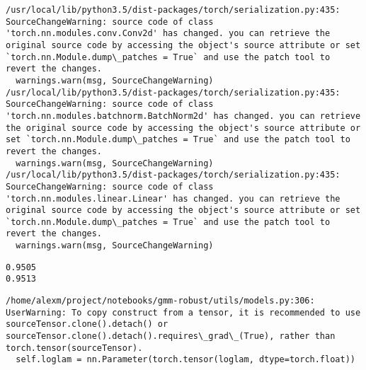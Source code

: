 \documentclass[11pt]{article}
\begin{document}
    \begin{Verbatim}[commandchars=\\\{\}]
/usr/local/lib/python3.5/dist-packages/torch/serialization.py:435: SourceChangeWarning: source code of class 'torch.nn.modules.conv.Conv2d' has changed. you can retrieve the original source code by accessing the object's source attribute or set `torch.nn.Module.dump\_patches = True` and use the patch tool to revert the changes.
  warnings.warn(msg, SourceChangeWarning)
/usr/local/lib/python3.5/dist-packages/torch/serialization.py:435: SourceChangeWarning: source code of class 'torch.nn.modules.batchnorm.BatchNorm2d' has changed. you can retrieve the original source code by accessing the object's source attribute or set `torch.nn.Module.dump\_patches = True` and use the patch tool to revert the changes.
  warnings.warn(msg, SourceChangeWarning)
/usr/local/lib/python3.5/dist-packages/torch/serialization.py:435: SourceChangeWarning: source code of class 'torch.nn.modules.linear.Linear' has changed. you can retrieve the original source code by accessing the object's source attribute or set `torch.nn.Module.dump\_patches = True` and use the patch tool to revert the changes.
  warnings.warn(msg, SourceChangeWarning)

    \end{Verbatim}

    \begin{Verbatim}[commandchars=\\\{\}]
0.9505
0.9513

    \end{Verbatim}

    \begin{Verbatim}[commandchars=\\\{\}]
/home/alexm/project/notebooks/gmm-robust/utils/models.py:306: UserWarning: To copy construct from a tensor, it is recommended to use sourceTensor.clone().detach() or sourceTensor.clone().detach().requires\_grad\_(True), rather than torch.tensor(sourceTensor).
  self.loglam = nn.Parameter(torch.tensor(loglam, dtype=torch.float))

    \end{Verbatim}
\end{document}
